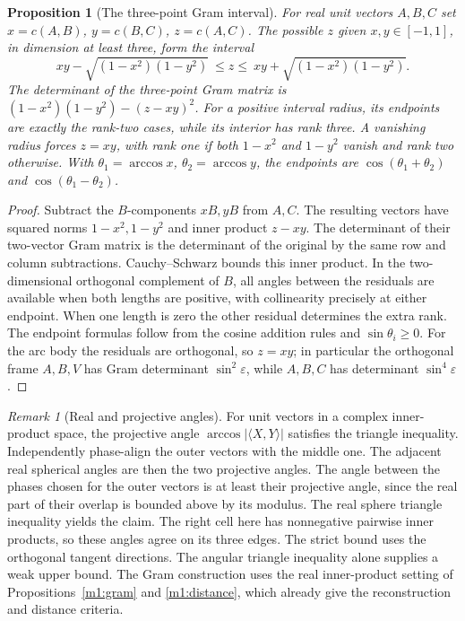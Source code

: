 \documentclass[11pt,reqno]{amsart}
\newtheorem{proposition}[theorem]{Proposition}
\theoremstyle{definition}
\theoremstyle{remark}
\newtheorem{remark}[theorem]{Remark}
\numberwithin{equation}{section}
\begin{document}
\begin{proposition}[The three-point Gram interval]\label{m5:gram-interval}
For real unit vectors \(A,B,C\) set \(x=c(A,B)\), \(y=c(B,C)\),
\(z=c(A,C)\). The possible \(z\) given \(x,y\in[-1,1]\), in dimension
at least three, form the interval
\[
 xy-\sqrt{(1-x^2)(1-y^2)}\ \le z\le\
 xy+\sqrt{(1-x^2)(1-y^2)}.
\]
The determinant of the three-point Gram matrix is
\((1-x^2)(1-y^2)-(z-xy)^2\). For a positive interval radius, its endpoints
are exactly the rank-two cases, while its interior has rank three.
A vanishing radius forces \(z=xy\), with rank one if both \(1-x^2\) and
\(1-y^2\) vanish and rank two otherwise. With \(\theta_1=\arccos x\),
\(\theta_2=\arccos y\), the endpoints are \(\cos(\theta_1+\theta_2)\)
and \(\cos(\theta_1-\theta_2)\).
\end{proposition}
\begin{proof}
Subtract the \(B\)-components \(xB,yB\) from \(A,C\). The resulting
vectors have squared norms \(1-x^2,1-y^2\) and inner product \(z-xy\).
The determinant of their two-vector Gram matrix is the determinant of
the original by the same row and column subtractions. Cauchy--Schwarz
bounds this inner product. In the two-dimensional orthogonal complement
of \(B\), all angles between the residuals are available when both
lengths are positive, with collinearity precisely at either endpoint.
When one length is zero the other residual determines the extra rank.
The endpoint formulas follow from the cosine addition rules and
\(\sin\theta_i\geq0\). For the arc body the residuals are orthogonal,
so \(z=xy\); in particular the orthogonal frame \(A,B,V\) has Gram
determinant \(\sin^2\varepsilon\), while \(A,B,C\) has determinant
\(\sin^4\varepsilon\).
\end{proof}

\begin{remark}[Real and projective angles]\label{m5:angles}
For unit vectors in a complex inner-product space, the projective angle
\(\arccos|\langle X,Y\rangle|\) satisfies the triangle inequality.
Independently phase-align the outer vectors with the middle one.
The adjacent real spherical angles are then the two projective angles.
The angle between the phases chosen for the outer vectors is at least
their projective angle, since the real part of their overlap is bounded
above by its modulus. The real sphere triangle inequality yields the
claim. The right cell here has nonnegative pairwise inner products,
so these angles agree on its three edges. The strict bound uses the
orthogonal tangent directions. The angular triangle inequality alone
supplies a weak upper bound. The Gram construction uses the real
inner-product setting of Propositions~\ref{m1:gram} and
\ref{m1:distance}, which already give the reconstruction and distance
criteria.
\end{remark}
\end{document}
